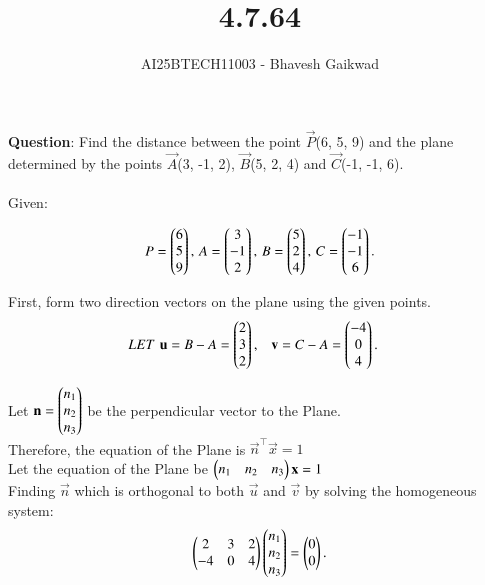 \documentclass[journal]{IEEEtran}
\begin{document}

\vspace{3cm}

\title{4.7.64}
\author{AI25BTECH11003 - Bhavesh Gaikwad}
{\let\newpage\relax\maketitle}

\renewcommand{\thefigure}{\theenumi}
\renewcommand{\thetable}{\theenumi}
\setlength{\intextsep}{10pt} 


\renewcommand{\thetable}{\theenumi}


\textbf{Question}: Find the distance between the point $\vec{P}$(6, 5, 9) and the plane determined by the points $\vec{A}$(3, -1, 2), $\vec{B}$(5, 2, 4) and $\vec{C}$(-1, -1, 6). \\


\solution
\\Given:

\begin{align}
P = \begin{pmatrix}6\\5\\9\end{pmatrix}, \,
A = \begin{pmatrix}3\\-1\\2\end{pmatrix}, \,
B = \begin{pmatrix}5\\2\\4\end{pmatrix}, \,
C = \begin{pmatrix}-1\\-1\\6\end{pmatrix}.
\end{align}

First, form two direction vectors on the plane using the given points.
\begin{align} LET \, \,
\mathbf{u} &= B - A = \begin{pmatrix}2\\3\\2\end{pmatrix}, &
\mathbf{v} &= C - A = \begin{pmatrix}-4\\0\\4\end{pmatrix}.
\end{align}

Let $\mathbf{n} = \begin{pmatrix}n_1 \\ n_2 \\ n_3\end{pmatrix}$ be the perpendicular vector to the Plane.\\
Therefore, the equation of the Plane is $\vec{n}^\top \vec{x}=1$\\
Let the equation of the Plane be $\begin{pmatrix}n_1 & n_2 & n_3\end{pmatrix}\mathbf{x}=1$\\

Finding $\vec{n}$ which is orthogonal to both $\vec{u}$ and $\vec{v}$ by solving the homogeneous system:
\begin{equation}
\begin{pmatrix}2 & 3 & 2\\ -4 & 0 & 4\end{pmatrix}\begin{pmatrix}n_1\\n_2\\n_3\end{pmatrix}=\begin{pmatrix}0\\0\end{pmatrix}.
\end{equation}
\end{document}
